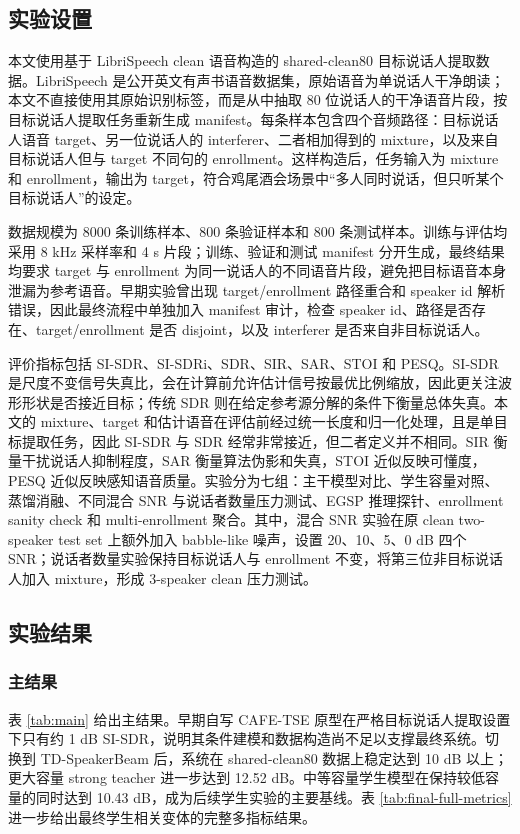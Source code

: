 \documentclass[UTF8,zihao=5,a4paper]{ctexart}
\newcommand{\sisdr}{SI-SDR}
\begin{document}
\subsection{实验设置}

本文使用基于 LibriSpeech clean 语音构造的 shared-clean80 目标说话人提取数据。LibriSpeech 是公开英文有声书语音数据集，原始语音为单说话人干净朗读；本文不直接使用其原始识别标签，而是从中抽取 80 位说话人的干净语音片段，按目标说话人提取任务重新生成 manifest。每条样本包含四个音频路径：目标说话人语音 target、另一位说话人的 interferer、二者相加得到的 mixture，以及来自目标说话人但与 target 不同句的 enrollment。这样构造后，任务输入为 mixture 和 enrollment，输出为 target，符合鸡尾酒会场景中“多人同时说话，但只听某个目标说话人”的设定。

数据规模为 8000 条训练样本、800 条验证样本和 800 条测试样本。训练与评估均采用 8 kHz 采样率和 4 s 片段；训练、验证和测试 manifest 分开生成，最终结果均要求 target 与 enrollment 为同一说话人的不同语音片段，避免把目标语音本身泄漏为参考语音。早期实验曾出现 target/enrollment 路径重合和 speaker id 解析错误，因此最终流程中单独加入 manifest 审计，检查 speaker id、路径是否存在、target/enrollment 是否 disjoint，以及 interferer 是否来自非目标说话人。

评价指标包括 \sisdr{}、\sisdr{}i、SDR、SIR、SAR、STOI 和 PESQ。\sisdr{} 是尺度不变信号失真比，会在计算前允许估计信号按最优比例缩放，因此更关注波形形状是否接近目标；传统 SDR 则在给定参考源分解的条件下衡量总体失真。本文的 mixture、target 和估计语音在评估前经过统一长度和归一化处理，且是单目标提取任务，因此 \sisdr{} 与 SDR 经常非常接近，但二者定义并不相同。SIR 衡量干扰说话人抑制程度，SAR 衡量算法伪影和失真，STOI 近似反映可懂度，PESQ 近似反映感知语音质量。实验分为七组：主干模型对比、学生容量对照、蒸馏消融、不同混合 SNR 与说话者数量压力测试、EGSP 推理探针、enrollment sanity check 和 multi-enrollment 聚合。其中，混合 SNR 实验在原 clean two-speaker test set 上额外加入 babble-like 噪声，设置 20、10、5、0 dB 四个 SNR；说话者数量实验保持目标说话人与 enrollment 不变，将第三位非目标说话人加入 mixture，形成 3-speaker clean 压力测试。

\subsection{实验结果}

\subsubsection{主结果}

表 \ref{tab:main} 给出主结果。早期自写 CAFE-TSE 原型在严格目标说话人提取设置下只有约 1 dB \sisdr{}，说明其条件建模和数据构造尚不足以支撑最终系统。切换到 TD-SpeakerBeam 后，系统在 shared-clean80 数据上稳定达到 10 dB 以上；更大容量 strong teacher 进一步达到 12.52 dB。中等容量学生模型在保持较低容量的同时达到 10.43 dB，成为后续学生实验的主要基线。表 \ref{tab:final-full-metrics} 进一步给出最终学生相关变体的完整多指标结果。
\end{document}
